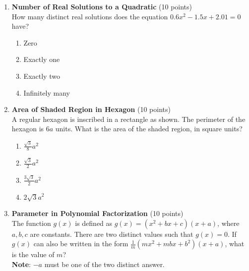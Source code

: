 \begin{enumerate}
  \newpage



  \item \textbf{Number of Real Solutions to a Quadratic} (10 points)\\
  How many distinct real solutions does the equation $0.6x^2 - 1.5x + 2.01 = 0$ have?
  \begin{enumerate}[label=(\Alph*)]
    \item Zero
    \item Exactly one
    \item Exactly two
    \item Infinitely many
  \end{enumerate}
  \begin{subanswer}
  \end{subanswer}



  \item \textbf{Area of Shaded Region in Hexagon} (10 points)\\
  A regular hexagon is inscribed in a rectangle as shown.
  The perimeter of the hexagon is $6a$ units. What is the area of the shaded region, in square units?
  \begin{enumerate}[label=(\Alph*)]
    \item $\frac{\sqrt{3}}{8}a^2$
    \item $\frac{\sqrt{3}}{2}a^2$
    \item $\frac{3\sqrt{3}}{2}a^2$
    \item $2\sqrt{3}a^2$
  \end{enumerate}
  \begin{subanswer}
  \end{subanswer}




  \newpage


  \item \textbf{Parameter in Polynomial Factorization} (10 points)\\
  The function $g(x)$ is defined as $g(x) = (x^2 + bx + c)(x + a)$, 
  where $a, b, c$ are constants. There are two distinct values such 
  that $g(x) = 0$. If $g(x)$ can also be written in the form 
  $\frac{1}{m}(mx^2 + mbx + b^2)(x + a)$, what is the value of $m$?\\
  \textbf{Note}: $-a$ must be one of the two distinct answer.
  \begin{subanswer}
  \end{subanswer}




\end{enumerate}
